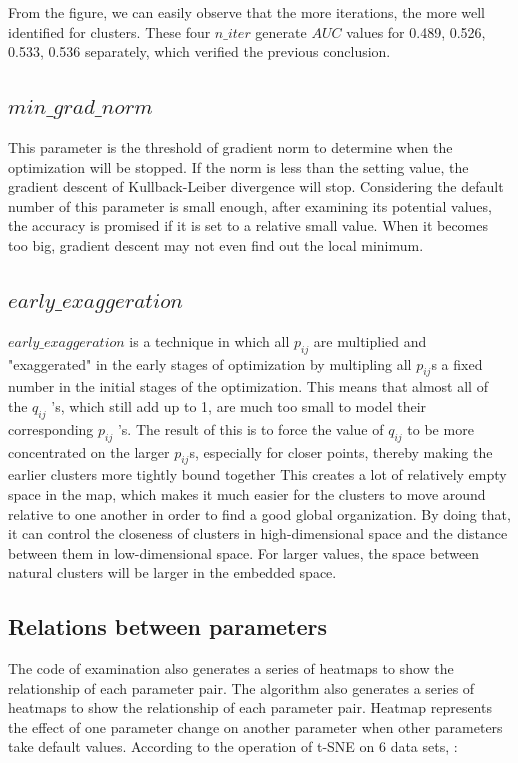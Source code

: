 \noindent From the figure, we can easily observe that the more iterations, the more well identified for clusters. These four $n\_iter$ generate $AUC$ values for 0.489, 0.526, 0.533, 0.536 separately, which verified the previous conclusion.

\subsection{$min\_grad\_norm$}

This parameter is the threshold of gradient norm to determine when the optimization will be stopped. If the norm is less than the setting value, the gradient descent of Kullback-Leiber divergence will stop. Considering the default number of this parameter is small enough, after examining its potential values, the accuracy is promised if it is set to a relative small value. When it becomes too big, gradient descent may not even find out the local minimum.

\subsection{$early\_exaggeration$}

$ early\_exaggeration $ is a technique in which all $p_{ij}$ are multiplied and "exaggerated" in the early stages of optimization by multipling all $p_{ij}$s a fixed number in the initial stages of the optimization. This means that almost all of the $q_{ij}$ ’s, which still add up to 1, are much too small to model their corresponding $p_{ij}$ ’s. The result of this is to force the value of $q_ {ij}$ to be more concentrated on the larger $ p_{ij} $s, especially for closer points, thereby making the earlier clusters more tightly bound together This creates a lot of relatively empty space in the map, which makes it much easier for the clusters to move around relative to one another in order to find a good global organization\cite{ref13}. By doing that, it can control the closeness of clusters in high-dimensional space and the distance between them in low-dimensional space. For larger values, the space between natural clusters will be larger in the embedded space.


\subsection{Relations between parameters}

The code of examination also generates a series of heatmaps to show the relationship of each parameter pair. The algorithm also generates a series of heatmaps to show the relationship of each parameter pair. Heatmap represents the effect of one parameter change on another parameter when other parameters take default values. According to the operation of t-SNE on 6 data sets, :


